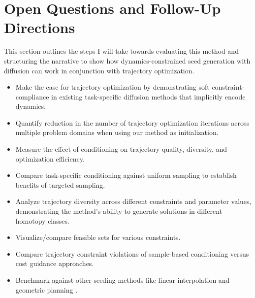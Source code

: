 \section{Open Questions and Follow-Up Directions}
\label{sec:seeding:open}


This section outlines the steps I will take towards evaluating this method and structuring the narrative to show how dynamics-constrained seed generation with diffusion can work in conjunction with trajectory optimization.

\begin{itemize}
    \item Make the case for trajectory optimization by demonstrating soft constraint-compliance in existing task-specific diffusion methods that implicitly encode dynamics.
    \item Quantify reduction in the number of trajectory optimization iterations across multiple problem domains when using our method as initialization.
    \item Measure the effect of conditioning on trajectory quality, diversity, and optimization efficiency.
    \item Compare task-specific conditioning against uniform sampling to establish benefits of targeted sampling.
    \item Analyze trajectory diversity across different constraints and parameter values, demonstrating the method's ability to generate solutions in different homotopy classes.
    \item Visualize/compare feasible sets for various constraints.
    \item Compare trajectory constraint violations of sample-based conditioning versus cost guidance approaches.
    \item Benchmark against other seeding methods like linear interpolation and geometric planning \cite{thomason2024motions}.
\end{itemize}
